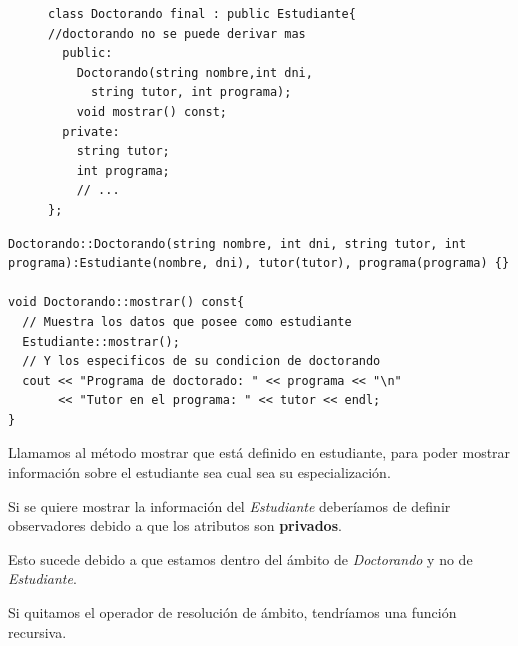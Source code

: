 \begin{figure}
\begin{minipage}[t]{0.75\textwidth}
\begin{lstlisting}[frame=single]
class Doctorando final : public Estudiante{ 
//doctorando no se puede derivar mas
  public:
    Doctorando(string nombre,int dni,
	  string tutor, int programa);
    void mostrar() const;
  private:
    string tutor; 
    int programa; 
    // ...
};
	\end{lstlisting}
\end{minipage}
\end{figure}

\begin{center}
	\begin{lstlisting}[frame=single]
Doctorando::Doctorando(string nombre, int dni, string tutor, int programa):Estudiante(nombre, dni), tutor(tutor), programa(programa) {}
  
void Doctorando::mostrar() const{
  // Muestra los datos que posee como estudiante
  Estudiante::mostrar();
  // Y los especificos de su condicion de doctorando
  cout << "Programa de doctorado: " << programa << "\n"
       << "Tutor en el programa: " << tutor << endl;
}
\end{lstlisting}
\end{center}

Llamamos al método mostrar que está definido en estudiante, para poder mostrar información sobre el estudiante sea cual sea su especialización.

Si se quiere mostrar la información del \textit{Estudiante} deberíamos de definir observadores debido a que los atributos son \textbf{privados}.

Esto sucede debido a que estamos dentro del ámbito de \textit{Doctorando} y no de \textit{Estudiante}.

Si quitamos el operador de resolución de ámbito, tendríamos una función recursiva.

